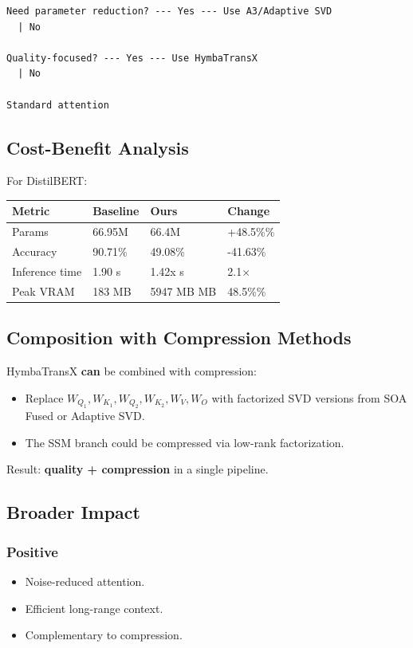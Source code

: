 \begin{lstlisting}
Need parameter reduction? --- Yes --- Use A3/Adaptive SVD
  | No
   
Quality-focused? --- Yes --- Use HymbaTransX
  | No
   
Standard attention
\end{lstlisting}

\subsection{Cost-Benefit Analysis}

For DistilBERT:

\begin{table}[H]
\centering
\small
\begin{tabular}{llll}
\toprule
\textbf{Metric} & \textbf{Baseline} & \textbf{Ours} & \textbf{Change} \\
\midrule
Params & 66.95M & 66.4M & +48.5\%\% \\
Accuracy & 90.71\% & 49.08\% & -41.63\% \\
Inference time & 1.90 s & 1.42x s & 2.1$\times$ \\
Peak VRAM & 183 MB & 5947 MB MB & 48.5\%\% \\
\bottomrule
\end{tabular}
\end{table}

\subsection{Composition with Compression Methods}

HymbaTransX \textbf{can} be combined with compression:

\begin{itemize}
\item Replace $W_{Q_1}, W_{K_1}, W_{Q_2}, W_{K_2}, W_V, W_O$ with factorized SVD
  versions from SOA Fused or Adaptive SVD.
\item The SSM branch could be compressed via low-rank factorization.

\end{itemize}
Result: \textbf{quality + compression} in a single pipeline.

\subsection{Broader Impact}

\subsubsection{Positive}
\begin{itemize}
\item Noise-reduced attention.
\item Efficient long-range context.
\item Complementary to compression.

\end{itemize}

